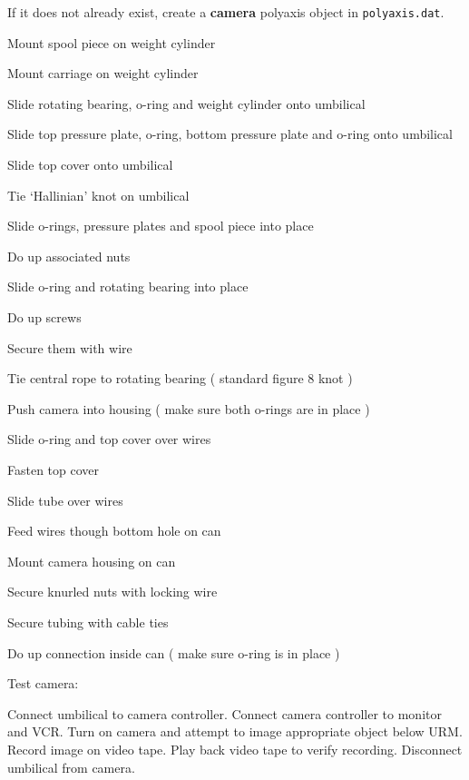 \begin{enumerate}

\checkitem If it does not already exist, create a {\bf camera}
  polyaxis object in {\tt polyaxis.dat}.

\checkitem Mount spool piece on weight cylinder

\checkitem Mount carriage on weight cylinder

\checkitem Slide rotating bearing, o-ring and weight cylinder onto umbilical

\checkitem Slide top pressure plate, o-ring, bottom pressure 
           plate and o-ring onto umbilical

\checkitem Slide top cover onto umbilical

\checkitem Tie `Hallinian' knot on umbilical

\checkitem Slide o-rings, pressure plates and spool piece into place

\checkitem Do up associated nuts

\checkitem Slide o-ring and rotating bearing into place

\checkitem Do up screws

\checkitem Secure them with wire

\checkitem Tie central rope to rotating bearing ( standard figure 8 knot )

\checkitem Push camera into housing ( make sure both o-rings are in place )

\checkitem Slide o-ring and top cover over wires

\checkitem Fasten top cover

\checkitem Slide tube over wires

\checkitem Feed wires though bottom hole on can

\checkitem Mount camera housing on can

\checkitem Secure knurled nuts with locking wire

\checkitem Secure tubing with cable ties

\checkitem Do up connection inside can ( make sure o-ring is in place )

\checkitem Test camera:
  \begin{enumerate}
  \checkitem Connect umbilical to camera controller.
  \checkitem Connect camera controller to monitor and VCR.
  \checkitem Turn on camera and attempt to image appropriate object
     below URM.
  \checkitem Record image on video tape.
  \checkitem Play back video tape to verify recording.
  \checkitem Disconnect umbilical from camera.
  \end{enumerate}


\end{enumerate}
